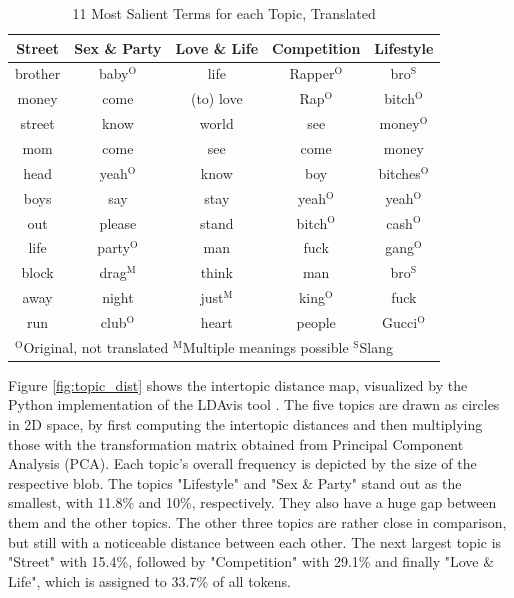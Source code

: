 \documentclass[conference]{IEEEtran}
\begin{document}
\begin{table}[htbp]
\caption{11 Most Salient Terms for each Topic, Translated}
\begin{center}
\begin{tabular}{|c|c|c|c|c|}
\hline
\textbf{Street}&\textbf{Sex \& Party}&\textbf{Love \& Life}&\textbf{Competition}&\textbf{Lifestyle} \\
\cline{1-5}
\hline
brother & baby$^{\mathrm{O}}$ & life & Rapper$^{\mathrm{O}}$ & bro$^{\mathrm{S}}$ \\
\hline
money & come & (to) love & Rap$^{\mathrm{O}}$ & bitch$^{\mathrm{O}}$ \\
\hline
street & know & world & see & money$^{\mathrm{O}}$ \\
\hline
mom & come & see & come & money \\
\hline
head & yeah$^{\mathrm{O}}$ & know & boy & bitches$^{\mathrm{O}}$ \\
\hline
boys & say & stay & yeah$^{\mathrm{O}}$ & yeah$^{\mathrm{O}}$ \\
\hline
out & please & stand & bitch$^{\mathrm{O}}$ & cash$^{\mathrm{O}}$ \\
\hline
life & party$^{\mathrm{O}}$ & man & fuck & gang$^{\mathrm{O}}$ \\
\hline
block & drag$^{\mathrm{M}}$ & think & man & bro$^{\mathrm{S}}$ \\
\hline
away & night & just$^{\mathrm{M}}$ & king$^{\mathrm{O}}$ & fuck \\
\hline
run & club$^{\mathrm{O}}$ & heart & people & Gucci$^{\mathrm{O}}$ \\
\hline
\hline
\multicolumn{5}{l}{$^{\mathrm{O}}$Original, not translated $^{\mathrm{M}}$Multiple meanings possible $^{\mathrm{S}}$Slang}
\end{tabular}
\label{tab:topics}
\end{center}
\end{table}

Figure \ref{fig:topic_dist} shows the intertopic distance map, visualized by the Python implementation of the LDAvis tool \cite{sievert-shirley-2014-ldavis}. The five topics are drawn as circles in 2D space, by first computing the intertopic distances and then multiplying those with the transformation matrix obtained from Principal Component Analysis (PCA). Each topic's overall frequency is depicted by the size of the respective blob. The topics "Lifestyle" and "Sex \& Party" stand out as the smallest, with 11.8\% and 10\%, respectively. They also have a huge gap between them and the other topics. The other three topics are rather close in comparison, but still with a noticeable distance between each other. The next largest topic is "Street" with 15.4\%, followed by "Competition" with 29.1\% and finally "Love \& Life", which is assigned to 33.7\% of all tokens.
\end{document}
